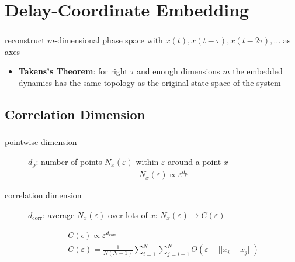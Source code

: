 \begin{frame}
\begin{figure}
\begin{subfigure}[b]{0.3\textwidth}
  \end{subfigure}
\end{figure}
\end{frame}

\section{Delay-Coordinate Embedding}
\begin{frame}
  \frametitle{\insertsectionhead}
  \framesubtitle{\insertsubsectionhead}
  reconstruct $m$-dimensional phase space with $x(t), x(t-\tau), x(t-2\tau), \ldots$ as axes
  \begin{itemize}
    \item \textbf{Takens's Theorem}: for right $\tau$ and enough dimensions $m$ the embedded dynamics has the same topology as the original state-space of the system
  \end{itemize}
\end{frame}

\subsection{Correlation Dimension}
\begin{frame}
  \frametitle{\insertsectionhead}
  \framesubtitle{\insertsubsectionhead}

\begin{description}
  \item[pointwise dimension] 

  $d_\mathrm{p}$: number of points $N_x(\varepsilon)$ within $\varepsilon$ around a point $x$
\begin{gather*}
N_x(\varepsilon) \propto \varepsilon^{d_\mathrm{p}}
\end{gather*}
\item[correlation dimension]
$d_\mathrm{corr}$: average $N_x(\varepsilon)$ over lots of $x$: $N_x(\varepsilon)\to C(\varepsilon)$

\begin{gather*}
C(\epsilon) \propto \varepsilon^{d_\text{corr}}\\
C(\varepsilon) =\frac{1}{N(N-1)} \sum_{i=1}^N\sum_{j=i+1}^N \Theta(\varepsilon-||x_i-x_j||)\\
\end{gather*}

\end{description}
\end{frame}

